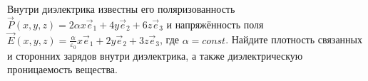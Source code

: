 \documentclass[__main__.tex]{subfiles}
\begin{document}
Внутри диэлектрика известны его поляризованность $\vec{P}(x,y,z)=2\alpha x\vec{e}_1+4y\vec{e}_2+6z\vec{e}_3$ и напряжённость поля $\vec{E}(x,y,z)=\frac{\alpha}{\varepsilon_0}x\vec{e}_1+2y\vec{e}_2+3z\vec{e}_3$, где $\alpha=const$. Найдите плотность связанных и сторонних зарядов внутри диэлектрика, а также диэлектрическую проницаемость вещества.\\ 

\end{document}
